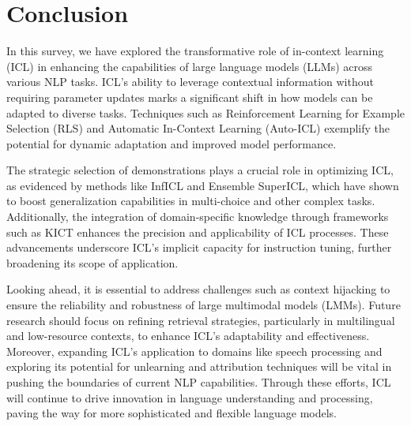 \section{Conclusion} \label{sec:Conclusion}

In this survey, we have explored the transformative role of in-context learning (ICL) in enhancing the capabilities of large language models (LLMs) across various NLP tasks. ICL's ability to leverage contextual information without requiring parameter updates marks a significant shift in how models can be adapted to diverse tasks. Techniques such as Reinforcement Learning for Example Selection (RLS) and Automatic In-Context Learning (Auto-ICL) exemplify the potential for dynamic adaptation and improved model performance.

The strategic selection of demonstrations plays a crucial role in optimizing ICL, as evidenced by methods like InfICL and Ensemble SuperICL, which have shown to boost generalization capabilities in multi-choice and other complex tasks. Additionally, the integration of domain-specific knowledge through frameworks such as KICT enhances the precision and applicability of ICL processes. These advancements underscore ICL's implicit capacity for instruction tuning, further broadening its scope of application.

Looking ahead, it is essential to address challenges such as context hijacking to ensure the reliability and robustness of large multimodal models (LMMs). Future research should focus on refining retrieval strategies, particularly in multilingual and low-resource contexts, to enhance ICL's adaptability and effectiveness. Moreover, expanding ICL's application to domains like speech processing and exploring its potential for unlearning and attribution techniques will be vital in pushing the boundaries of current NLP capabilities. Through these efforts, ICL will continue to drive innovation in language understanding and processing, paving the way for more sophisticated and flexible language models.
